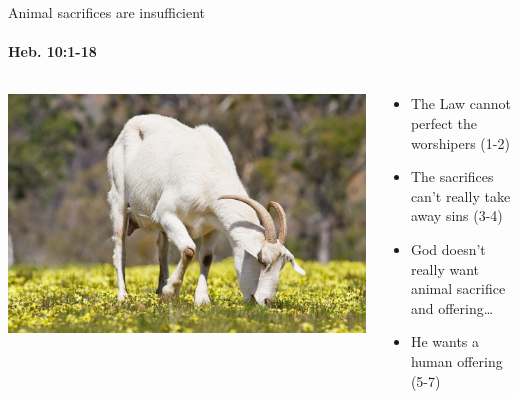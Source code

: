 \begin{frame}{Animal sacrifices are insufficient}
\framesubtitle{Heb. 10:1-18}

\begin{columns}[c]
\begin{column}{0.5\textwidth}
	\includegraphics[width=\columnwidth]{figures/goat.jpg}
\end{column}
\begin{column}{0.5\textwidth}
	\begin{itemize}
		\item The Law cannot perfect the worshipers (1-2)
		\item The sacrifices can't really take away sins (3-4)
		\item God doesn't really want animal sacrifice and offering\ldots 
		\item He wants a human offering (5-7)
	\end{itemize}
\end{column}
\end{columns}


\end{frame}

